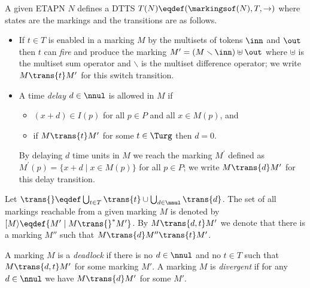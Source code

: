 A given ETAPN $N$ %
defines a DTTS $T(N)\eqdef (\markingsof(N),T,\rightarrow)$
where states are the markings and the transitions are as follows. 
\begin{itemize}
\item If $t\in T$ is enabled in a marking $M$ by the  multisets of
tokens $\inn$ and $\out$ then $t$ can \emph{fire} and produce 
the marking $M^{\prime} = (M \smallsetminus \inn) \uplus \out$ 
where  $\uplus$ is the multiset sum operator and $\smallsetminus$ is the multiset 
difference operator; we write $M \trans{t} M^{\prime}$ for this 
switch transition.
\item A time \emph{delay} $d \in \nnul$ is allowed in $M$ if
\begin{itemize}
\item $(x+d) \in I(p)$ for all $p \in P$ and all $x \in M(p)$, and
\item if $M \trans{t} M'$ for some $t \in \Turg$ then $d=0$.
\end{itemize}
By delaying $d$ time units in $M$ we reach the marking $M^{\prime}$ defined as
$M^{\prime}(p) = \{x+d \mid x \in M(p)\}$ for all $p \in P$; 
we write $M \trans{d} M^{\prime}$ for this delay transition.
\end{itemize}


\noindent Let 
$\trans{} \eqdef \bigcup_{t \in T} \trans{t} \cup \bigcup_{d \in \nnul} \trans{d}$.
The set of all markings reachable %
from a given marking $M$ is denoted by 
$[M\rangle \eqdef \{ M' \mid M \trans{}^* M' \}$.
By $M \trans{d,t} M'$ we denote that there is a marking $M''$
such that $M \trans{d} M'' \trans{t} M'$.

A marking $M$ is a \emph{deadlock} if there is no $d \in \nnul$ and
no $t \in T$ such that $M \trans{d,t} M'$ 
for some marking $M'$.
A marking $M$ is \emph{divergent} if for any $d \in \nnul$
we have $M \trans{d} M'$ for some $M'$.


